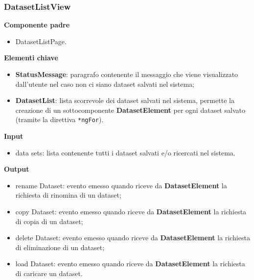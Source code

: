 \subsubsection{DatasetListView}
\textbf{Componente padre}
\begin{itemize}
    \item DatasetListPage.
\end{itemize}
\textbf{Elementi chiave}
\begin{itemize}
    \item \textbf{StatusMessage}: paragrafo contenente il messaggio che viene visualizzato dall'utente nel caso non ci siano dataset salvati nel sistema;
    \item \textbf{DatasetList}: lista scorrevole dei dataset salvati nel sistema, permette la creazione di un sottocomponente \textbf{DatasetElement} per ogni dataset salvato (tramite la direttiva \texttt{*ngFor}).
\end{itemize}
\textbf{Input}
\begin{itemize}
    \item data sets: lista contenente tutti i dataset salvati e/o ricercati nel sistema.
\end{itemize}
\textbf{Output}
\begin{itemize}
    \item rename Dataset: evento emesso quando riceve da \textbf{DatasetElement} la richiesta di rinomina di un dataset;
    \item copy Dataset: evento emesso quando riceve da \textbf{DatasetElement} la richiesta di copia di un dataset;
    \item delete Dataset: evento emesso quando riceve da \textbf{DatasetElement} la richiesta di eliminazione di un dataset;
    \item load Dataset: evento emesso quando riceve da \textbf{DatasetElement} la richiesta di caricare un dataset.
\end{itemize}

